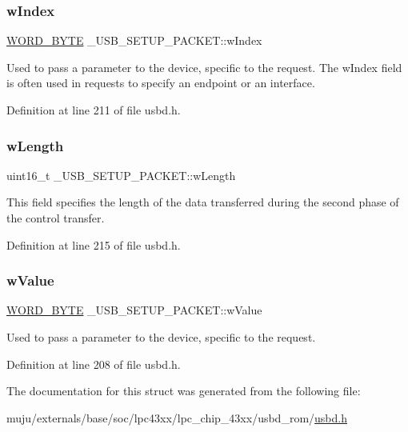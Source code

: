 \subsubsection{\texorpdfstring{w\+Index}{wIndex}}
{\footnotesize\ttfamily \hyperlink{group___u_s_b_d___core_ga340ec8de2973608b96d5cc7379b9561a}{W\+O\+R\+D\+\_\+\+B\+Y\+TE} \+\_\+\+U\+S\+B\+\_\+\+S\+E\+T\+U\+P\+\_\+\+P\+A\+C\+K\+E\+T\+::w\+Index}

Used to pass a parameter to the device, specific to the request. The w\+Index field is often used in requests to specify an endpoint or an interface. 

Definition at line 211 of file usbd.\+h.

\mbox{\label{struct___u_s_b___s_e_t_u_p___p_a_c_k_e_t_a2beb83e5854b4a7bc518e5cfbc3f38a6}} 
\subsubsection{\texorpdfstring{w\+Length}{wLength}}
{\footnotesize\ttfamily uint16\+\_\+t \+\_\+\+U\+S\+B\+\_\+\+S\+E\+T\+U\+P\+\_\+\+P\+A\+C\+K\+E\+T\+::w\+Length}

This field specifies the length of the data transferred during the second phase of the control transfer. 

Definition at line 215 of file usbd.\+h.

\mbox{\label{struct___u_s_b___s_e_t_u_p___p_a_c_k_e_t_a790f014cc1dac6148a182b1cbe24bffe}} 
\subsubsection{\texorpdfstring{w\+Value}{wValue}}
{\footnotesize\ttfamily \hyperlink{group___u_s_b_d___core_ga340ec8de2973608b96d5cc7379b9561a}{W\+O\+R\+D\+\_\+\+B\+Y\+TE} \+\_\+\+U\+S\+B\+\_\+\+S\+E\+T\+U\+P\+\_\+\+P\+A\+C\+K\+E\+T\+::w\+Value}

Used to pass a parameter to the device, specific to the request. 

Definition at line 208 of file usbd.\+h.



The documentation for this struct was generated from the following file\+:\begin{DoxyCompactItemize}
\item 
muju/externals/base/soc/lpc43xx/lpc\+\_\+chip\+\_\+43xx/usbd\+\_\+rom/\hyperlink{usbd_8h}{usbd.\+h}\end{DoxyCompactItemize}
